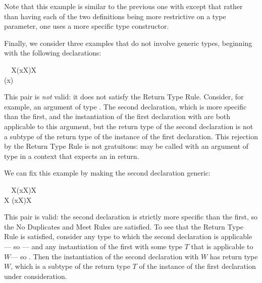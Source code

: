 \documentclass[10pt]{sigplanconf}
\begin{document}
Note that this example is similar to the previous one with 
except that rather than having each of the two definitions 
being more restrictive on a type parameter, 
one uses a more specific type constructor.

Finally, 
we consider three examples that do not involve generic types,
beginning with the following declarations:

\small
\begin{FortressCode}
{\tt ~~}\+\llbracket{}X\rrbracket(x\COLON X)\COLON X \\
  (x\COLON {})\COLON {}\-
\end{FortressCode}
\normalsize
This pair is \emph{not} valid: 
it does not satisfy the Return Type Rule.
Consider, for example, 
an argument of type .
The second declaration, 
which is more specific than the first,
and the instantiation of the first declaration with 
are both applicable to this argument,
but the return type  of the second declaration 
is not a subtype of the return type  of the instance of the first declaration.
This rejection by the Return Type Rule is not gratuitous: 
 may be called with an argument of type  
in a context that expects an  in return.

We can fix this example by making the second declaration generic:

\small
\begin{FortressCode}
{\tt ~~}\+\llbracket{}X\rrbracket(x\COLON X)\COLON X \\
  \llbracket{}X \SHORTCUT{<} \rrbracket(x\COLON X)\COLON X\-
\end{FortressCode}
\normalsize
This pair is valid: 
the second declaration is strictly more specific than the first, 
so the No Duplicates and Meet Rules are satisfied.
To see that the Return Type Rule is satisfied, 
consider any type  to which the second declaration is applicable---%
so ---%
and any instantiation of the first with some type $T$ that is applicable to $W$---%
so .
Then the instantiation of the second declaration with $W$ 
has return type $W$, which is a subtype of the return type $T$ 
of the instance of the first declaration under consideration.
\end{document}
